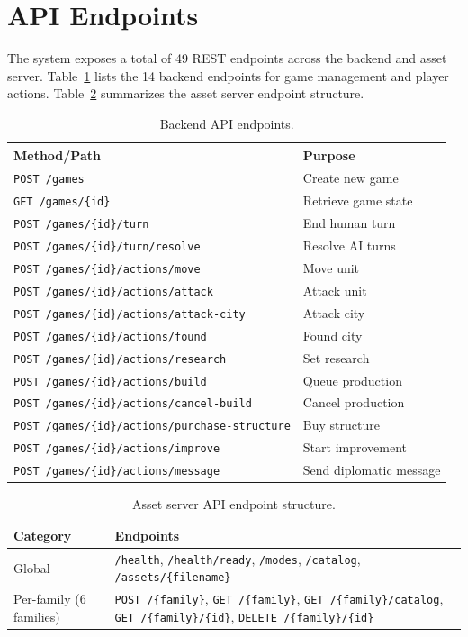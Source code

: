 \documentclass[conference]{IEEEtran}
\begin{document}
\section{API Endpoints}
\label{app:api}

The system exposes a total of 49 REST endpoints across the backend and asset server. Table~\ref{tab:api_backend} lists the 14 backend endpoints for game management and player actions. Table~\ref{tab:api_assets} summarizes the asset server endpoint structure.

\begin{table}[h]
\centering
\caption{Backend API endpoints.}
\label{tab:api_backend}
\begin{tabular}{@{}p{3cm}p{3.5cm}@{}}
\toprule
\textbf{Method/Path} & \textbf{Purpose} \\
\midrule
\texttt{POST /games} & Create new game \\
\texttt{GET /games/\{id\}} & Retrieve game state \\
\texttt{POST /games/\{id\}/turn} & End human turn \\
\texttt{POST /games/\{id\}/turn/resolve} & Resolve AI turns \\
\texttt{POST /games/\{id\}/actions/move} & Move unit \\
\texttt{POST /games/\{id\}/actions/attack} & Attack unit \\
\texttt{POST /games/\{id\}/actions/attack-city} & Attack city \\
\texttt{POST /games/\{id\}/actions/found} & Found city \\
\texttt{POST /games/\{id\}/actions/research} & Set research \\
\texttt{POST /games/\{id\}/actions/build} & Queue production \\
\texttt{POST /games/\{id\}/actions/cancel-build} & Cancel production \\
\texttt{POST /games/\{id\}/actions/purchase-structure} & Buy structure \\
\texttt{POST /games/\{id\}/actions/improve} & Start improvement \\
\texttt{POST /games/\{id\}/actions/message} & Send diplomatic message \\
\bottomrule
\end{tabular}
\end{table}

\begin{table}[h]
\centering
\caption{Asset server API endpoint structure.}
\label{tab:api_assets}
\begin{tabular}{@{}p{3cm}p{3.5cm}@{}}
\toprule
\textbf{Category} & \textbf{Endpoints} \\
\midrule
Global & \texttt{/health}, \texttt{/health/ready}, \texttt{/modes}, \texttt{/catalog}, \texttt{/assets/\{filename\}} \\
Per-family (6 families) & \texttt{POST /\{family\}}, \texttt{GET /\{family\}}, \texttt{GET /\{family\}/catalog}, \texttt{GET /\{family\}/\{id\}}, \texttt{DELETE /\{family\}/\{id\}} \\
\bottomrule
\end{tabular}
\end{table}
\end{document}
